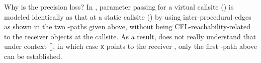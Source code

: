 


Why is the precision loss?
In \manuLFC, parameter passing for a virtual callsite () is modeled identically as that at a static callsite () by  using inter-procedural  edges as shown in the two \manuLFC-paths given above, without being CFL-reachability-related to the receiver objects at the callsite. As a result,
\manuLFC does not really understand that 
under context [], in which case 
 \texttt{x} points to the receiver ,
only 
the first \manuLFC-path above can be established.


\begin{comment}
The reason for such precision loss case is that the PAG constructed only require the context-insensitive call relation of a callgraph, so no matter how precise the call graph given is, it will lose all context-sensitive information contained. For example, \texttt{x} (line~17) points to \commentfont{A1} under context \texttt{c1}, which makes the parameter passing from \texttt{d} to \texttt{p} reachable under only \texttt{c1} and unreachable under \texttt{c2}. However, the only edge from \texttt{d} to \texttt{p} that could be added to PAG is \texttt{d}$\xrightarrow[\hat{\texttt{c3}}]{}$p, which means 
$\pointsto(\csabstraction{\mathtt{d}}{ctx}) \subseteq \pointsto(\csabstraction{\mathtt{p}}{\mathtt{c3}\mdoubleplus ctx})$ where $ctx$ is any context of \texttt{foo()} (not only \texttt{c1} but also \texttt{c2}). That is why \Cref{eq:LFCPathCGPreciseII} is valid in traditional \manuLFC. 
\end{comment}

